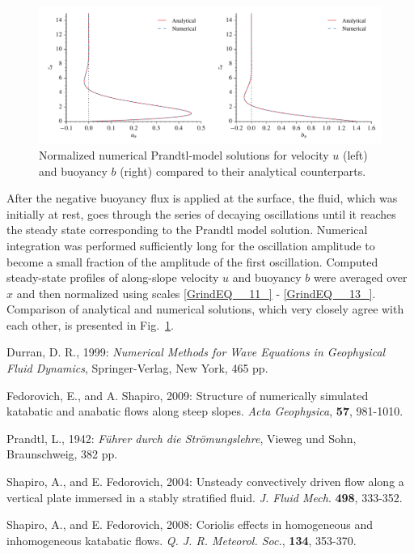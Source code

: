 \documentclass[gmd]{copernicus}
\begin{document}
\begin{figure}[t]
\vspace*{2mm}
\begin{center}
\includegraphics[width=16.6cm]{figs/prandtl.pdf}
\end{center}
\caption{Normalized numerical Prandtl-model solutions for velocity $u$ (left) and buoyancy $b$ (right) compared to their analytical counterparts.}
\label{prandtl}
\end{figure}

After the negative buoyancy flux is applied at the surface, the fluid, which was initially at rest, goes through the series of decaying oscillations until it reaches the steady state corresponding to the Prandtl model solution. Numerical integration was performed sufficiently long for the oscillation amplitude to become a small fraction of the amplitude of the first oscillation. Computed steady-state profiles of along-slope velocity $u$ and buoyancy $b$ were averaged over $x$ and then normalized using scales \eqref{GrindEQ__11_} - \eqref{GrindEQ__13_}. Comparison of analytical and numerical solutions, which very closely agree with each other, is presented in Fig.~\ref{prandtl}.

\conclusions  %



\nopagebreak

\smallskip

\noindent Durran, D. R., 1999: \textit{Numerical Methods for Wave Equations in Geophysical Fluid Dynamics}, Springer-Verlag, New York, 465 pp.

\smallskip

\noindent Fedorovich, E., and A. Shapiro, 2009: Structure of numerically simulated katabatic and anabatic flows along steep slopes. \textit{Acta Geophysica},  \textbf{57}, 981-1010.

\smallskip

\noindent Prandtl, L., 1942: \textit{F\"{u}hrer durch die Str\"{o}mungslehre}, Vieweg und Sohn, Braunschweig, 382 pp.

\smallskip

\noindent Shapiro, A., and E. Fedorovich, 2004: Unsteady convectively driven flow along a vertical plate immersed in a stably stratified fluid. \textit{J. Fluid Mech}. \textbf{498}, 333-352.

\smallskip

\noindent Shapiro, A., and E. Fedorovich, 2008: Coriolis effects in homogeneous and inhomogeneous katabatic flows. \textit{Q. J. R. Meteorol. Soc.}, \textbf{134}, 353-370.
\end{document}
